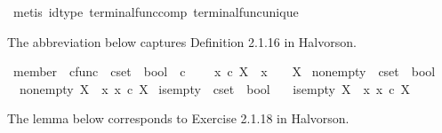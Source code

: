 \begin{isabellebody}
\isamarkupfalse%
\ {\isacharparenleft}{\kern0pt}metis\ id{\isacharunderscore}{\kern0pt}type\ terminal{\isacharunderscore}{\kern0pt}func{\isacharunderscore}{\kern0pt}comp\ terminal{\isacharunderscore}{\kern0pt}func{\isacharunderscore}{\kern0pt}unique{\isacharparenright}{\kern0pt}%
\endisatagproof
{\isafoldproof}%
%
\isadelimproof
%
\endisadelimproof
%
\isadelimdocument
%
\endisadelimdocument
%
\isatagdocument
%
\isamarkuptrue%
%
\endisatagdocument
{\isafolddocument}%
%
\isadelimdocument
%
\endisadelimdocument
%
\begin{isamarkuptext}%
The abbreviation below captures Definition 2.1.16 in Halvorson.%
\end{isamarkuptext}\isamarkuptrue%
\isamarkupfalse%
\ member\ {\isacharcolon}{\kern0pt}{\isacharcolon}{\kern0pt}\ {\isachardoublequoteopen}cfunc\ {\isasymRightarrow}\ cset\ {\isasymRightarrow}\ bool{\isachardoublequoteclose}\ {\isacharparenleft}{\kern0pt}\ {\isachardoublequoteopen}{\isasymin}\isactrlsub c{\isachardoublequoteclose}\ {}{}{\isacharparenright}{\kern0pt}\ \isanewline
\ \ {\isachardoublequoteopen}x\ {\isasymin}\isactrlsub c\ X\ {\isasymequiv}\ {\isacharparenleft}{\kern0pt}x\ {\isacharcolon}{\kern0pt}\ {\isasymone}\ {\isasymrightarrow}\ X{\isacharparenright}{\kern0pt}{\isachardoublequoteclose}\isanewline
\isanewline
{}\isamarkupfalse%
\ nonempty\ {\isacharcolon}{\kern0pt}{\isacharcolon}{\kern0pt}\ {\isachardoublequoteopen}cset\ {\isasymRightarrow}\ bool{\isachardoublequoteclose}\ \isanewline
\ \ {\isachardoublequoteopen}nonempty\ X\ {\isasymequiv}\ {\isacharparenleft}{\kern0pt}{\isasymexists}x{\isachardot}{\kern0pt}\ x\ {\isasymin}\isactrlsub c\ X{\isacharparenright}{\kern0pt}{\isachardoublequoteclose}\isanewline
\isanewline
{}\isamarkupfalse%
\ is{\isacharunderscore}{\kern0pt}empty\ {\isacharcolon}{\kern0pt}{\isacharcolon}{\kern0pt}\ {\isachardoublequoteopen}cset\ {\isasymRightarrow}\ bool{\isachardoublequoteclose}\ \isanewline
\ \ {\isachardoublequoteopen}is{\isacharunderscore}{\kern0pt}empty\ X\ {\isasymequiv}\ {\isasymnot}{\isacharparenleft}{\kern0pt}{\isasymexists}x{\isachardot}{\kern0pt}\ x\ {\isasymin}\isactrlsub c\ X{\isacharparenright}{\kern0pt}{\isachardoublequoteclose}%
\begin{isamarkuptext}%
The lemma below corresponds to Exercise 2.1.18 in Halvorson.%
\end{isamarkuptext}\isamarkuptrue%

\end{isabellebody}
